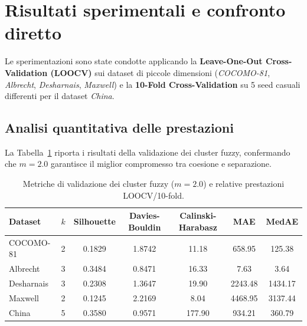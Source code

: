 \documentclass[11pt, a4paper]{article}
\begin{document}
\section{Risultati sperimentali e confronto diretto}\label{sec:risultati}
Le sperimentazioni sono state condotte applicando la \textbf{Leave-One-Out Cross-Validation (LOOCV)} sui dataset di piccole dimensioni (\textit{COCOMO-81}, \textit{Albrecht}, \textit{Desharnais}, \textit{Maxwell}) e la \textbf{10-Fold Cross-Validation} su 5 seed casuali differenti per il dataset \textit{China}.

\subsection{Analisi quantitativa delle prestazioni}

La Tabella~\ref{tab:clusters} riporta i risultati della validazione dei cluster
fuzzy, confermando che $m=2.0$ garantisce il miglior compromesso tra coesione e
separazione.

\begin{table}[htbp]
    \centering
    \caption{Metriche di validazione dei cluster fuzzy ($m=2.0$) e relative prestazioni LOOCV/10-fold.}\label{tab:clusters}
    \small
    \begin{tabular}{lcccccc}
        \toprule
        \rowcolor{tableheader} \textbf{Dataset} & \textbf{$k$} & \textbf{Silhouette} & \textbf{Davies-Bouldin} & \textbf{Calinski-Harabasz} & \textbf{MAE} & \textbf{MedAE} \\
        \midrule
        COCOMO-81                               & 2            & 0.1829              & 1.8742                  & 11.18                      & 658.95       & 125.38         \\
        \rowcolor{lightbg} Albrecht             & 3            & 0.3484              & 0.8471                  & 16.33                      & 7.63         & 3.64           \\
        Desharnais                              & 3            & 0.2308              & 1.3647                  & 19.90                      & 2243.48      & 1434.17        \\
        \rowcolor{lightbg} Maxwell              & 2            & 0.1245              & 2.2169                  & 8.04                       & 4468.95      & 3137.44        \\
        China                                   & 5            & 0.3580              & 0.9571                  & 177.90                     & 934.21       & 360.79         \\
        \bottomrule
    \end{tabular}
\end{table}
\end{document}
